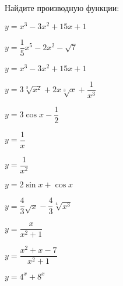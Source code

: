 \begin{listofex}
	\item Найдите производную функции:
	\begin{enumcols}[itemcolumns=2]
		\item \( y=x^3-3x^2+15x+1 \)
		\item \( y=\dfrac{1}{5}x^5-2x^2-\sqrt{7} \)
		\item \( y=x^3-3x^2+15x+1 \)
		\item \( y=3\sqrt[3]{x^2}+2x\sqrt[3]{x}+\dfrac{1}{x^3} \)
		\item \( y=3\cos x - \dfrac{1}{2} \)
		\item \( y=\dfrac{1}{x} \)
		\item \( y=\dfrac{1}{x^2} \)
		\item \( y=2\sin x + \cos x \)
		\item \( y=\dfrac{4}{3}\sqrt{x}-\dfrac{4}{3}\sqrt[4]{x^3} \)
		\item \( y=\dfrac{x}{x^2+1} \)
		\item \( y=\dfrac{x^2+x-7}{x^2+1} \)
		\item \( y=4^x+8^x \)
	\end{enumcols}
\end{listofex}